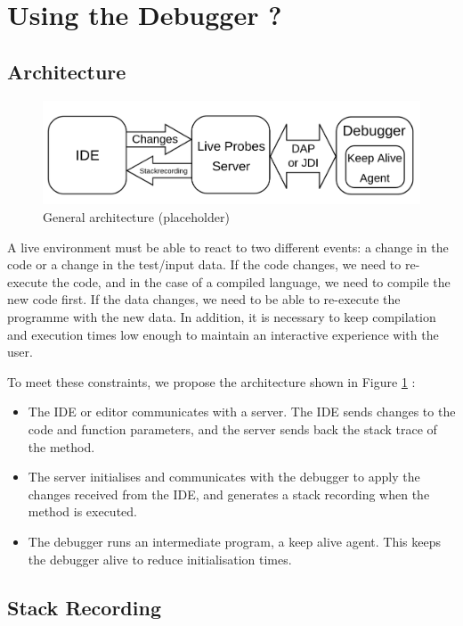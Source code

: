 \documentclass[english,submission]{programming}
\begin{document}
\section{Using the Debugger ?}

\subsection{Architecture}

\begin{figure}[h]
  \centering
  \includegraphics[width=0.8\linewidth]{img/architecture.png}
  \caption{General architecture (placeholder)}
  \label{fig:architecture}
\end{figure}

A live environment must be able to react to two different events: a change in the code or a change in the test/input data. 
If the code changes, we need to re-execute the code, and in the case of a compiled language, we need to compile the new code first. 
If the data changes, we need to be able to re-execute the programme with the new data. 
In addition, it is necessary to keep compilation and execution times low enough to maintain an interactive experience with the user.

To meet these constraints, we propose the architecture shown in Figure \ref{fig:architecture} :
\begin{itemize}
  \item The IDE or editor communicates with a server. The IDE sends changes to the code and function parameters, and the server sends back the stack trace of the method.
  \item The server initialises and communicates with the debugger to apply the changes received from the IDE, and generates a stack recording when the method is executed.
  \item The debugger runs an intermediate program, a keep alive agent. This keeps the debugger alive to reduce initialisation times.
\end{itemize}

\label{sec:stack-recording}

\subsection{Stack Recording}
\end{document}
